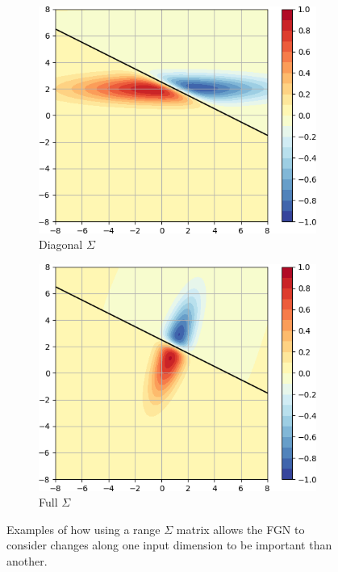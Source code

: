 \documentclass[12pt,oneside]{CUNY_PhD}
\begin{document}
\begin{figure}[!htbp]
    \centering
    \begin{subfigure}[t]{0.49\textwidth}
        \includegraphics[width=\textwidth]{images/Variants-Diag-Full-Cov/diag_full_activity_cropped.png}
        \caption*{Diagonal $\Sigma$}
    \end{subfigure}
    \begin{subfigure}[t]{0.49\textwidth}
        \includegraphics[width=\textwidth]{images/Variants-Diag-Full-Cov/full_full_activity_cropped.png}
        \caption*{Full $\Sigma$}
    \end{subfigure}
    \caption{Examples of how using a range $\Sigma$ matrix allows the FGN to consider changes along one input dimension to be important than another.}
    \label{fig:covars}
\end{figure}
\end{document}
